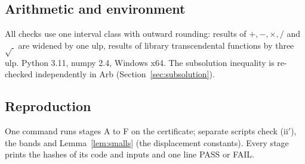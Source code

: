 \subsection{Arithmetic and environment}
All checks use one interval class with outward rounding: results of $+,-,\times,/$ and $\sqrt{\ }$ are widened by one ulp,
results of library transcendental functions by three ulp. Python 3.11, numpy 2.4, Windows x64. The subsolution
inequality is re-checked independently in Arb (Section~\ref{sec:subsolution}).

\subsection{Reproduction}
One command runs stages A to F on the certificate; separate scripts check (ii$'$), the bands and
Lemma~\ref{lem:smalls} (the displacement constants). Every stage prints the hashes of its code and inputs and one line
PASS or FAIL.
